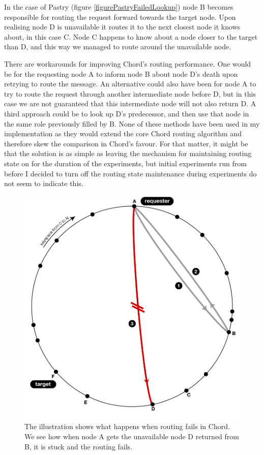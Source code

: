 In the case of Pastry (figure \ref{figurePastryFailedLookup}) node B becomes responsible for routing the request forward towards the target node. Upon realising node D is unavailable it routes it to the next closest node it knows about, in this case C. Node C happens to know about a node closer to the target than D, and this way we managed to route around the unavailable node.

There are workarounds for improving Chord's routing performance. One would be for the requesting node A to inform node B about node D's death upon retrying to route the message. An alternative could also have been for node A to try to route the request through another intermediate node before D, but in this case we are not guaranteed that this intermediate node will not also return D.
A third approach could be to look up D's predecessor, and then use that node in the same role previously filled by B. None of these methods have been used in my implementation as they would extend the core Chord routing algorithm and therefore skew the comparison in Chord's favour.
For that matter, it might be that the solution is as simple as leaving the mechanism for maintaining routing state on for the duration of the experiments, but initial experiments run from before I decided to turn off the routing state maintenance during experiments do not seem to indicate this.

\begin{figure}[!htb]
\begin{center}
  \includegraphics[width=0.9\linewidth]{illustrations/ChordRoutingFailed.png}
  \caption{The illustration shows what happens when routing fails in Chord. We see how when node A gets the unavailable node D returned from B, it is stuck and the routing fails.}
  \label{figureChordFailedLookup}
\end{center}
\end{figure}

